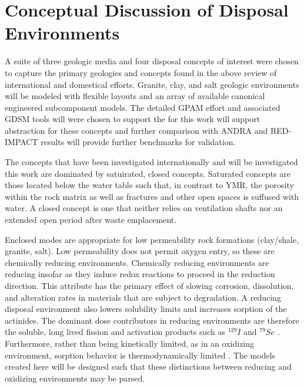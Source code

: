 \section{Conceptual Discussion of Disposal Environments}





A suite of three geologic media and four disposal concepts of interest were
chosen to capture the primary geologies and concepts found in the above review 
of international and domestical efforts. Granite, clay, and salt geologic 
environments will be modeled with flexible layouts and an array of available 
canonical engineered subcomponent models.  The detailed \gls{GPAM} effort and 
associated \gls{GDSM} tools will were chosen to support the for this work will 
support abstraction for these concepts and further comparison with \gls{ANDRA} 
and RED-IMPACT results will provide further benchmarks for validation.  

The concepts that have been investigated internationally and will be
investigated this work are dominated by satuirated, closed concepts. Saturated 
concepts are those located below the water table such that, in contrast to 
\gls{YMR}, the porosity within the rock matrix as well as fractures 
and other open spaces is suffused with water. A closed concept is one that 
neither relies on ventilation shafts nor an extended open period after waste 
emplacement.

Enclosed modes are appropriate for low permeability rock formations (clay/shale, 
granite, salt).  Low permeability does not permit oxygen entry, so these are
chemically reducing environments.  Chemically reducing environments are reducing 
insofar as they induce  redox reactions to proceed in the reduction direction. This 
attribute has the primary effect of slowing corrosion, dissolution, and  
alteration rates in materials that are subject to degradation. A reducing 
disposal environment also lowers solubility limits and increases sorption of the 
actinides. The dominant dose contributors in reducing environments are 
therefore the soluble, long lived fission and activation products such as $^{129}I$ 
and $^{79}Se$ \cite{oecd_advanced_2006 , von_lensa_red-impact_2008}.  
Furthermore, rather than being kinetically limited, as in an oxidizing 
environment, sorption behavior is thermodynamically limited 
\cite{nutt_personal_2011, schwartz_fundamentals_2004}. The models created here 
will be designed such that these distinctions between reducing and oxidizing 
environments may be parsed. 

